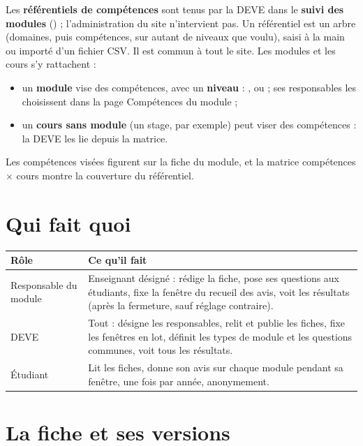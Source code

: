 \documentclass[11pt,a4paper]{article}
\begin{document}
Les \textbf{référentiels de compétences} sont tenus par la DEVE dans le \textbf{suivi des
modules} () ; l'administration du site n'intervient pas.
Un référentiel est un arbre (domaines, puis compétences, sur autant de niveaux que voulu),
saisi à la main ou importé d'un fichier CSV. Il est commun à tout le site. Les modules et les
cours s'y rattachent :
\begin{itemize}
  \item un \textbf{module} vise des compétences, avec un \textbf{niveau} : ,
     ou  ; ses responsables les choisissent dans la page
    \og Compétences\fg{} du module ;
  \item un \textbf{cours sans module} (un stage, par exemple) peut viser des compétences : la
    DEVE les lie depuis la matrice.
\end{itemize}
Les compétences visées figurent sur la fiche du module, et la matrice compétences $\times$
cours montre la couverture du référentiel.

\section{Qui fait quoi}

\begin{center}
\begin{tabularx}{\linewidth}{@{}l X@{}}
\toprule
\textbf{Rôle} & \textbf{Ce qu'il fait} \\
\midrule
Responsable du module & Enseignant désigné : rédige la fiche, pose ses questions
aux étudiants, fixe la fenêtre du recueil des avis, voit les résultats (après la fermeture, sauf
réglage contraire). \\
DEVE & Tout : désigne les responsables, relit et publie les fiches, fixe les fenêtres en lot,
définit les types de module et les questions communes, voit tous les résultats. \\
Étudiant & Lit les fiches, donne son avis sur chaque module pendant sa fenêtre, une fois par
année, anonymement. \\
\bottomrule
\end{tabularx}
\end{center}

\section{La fiche et ses versions}
\end{document}
